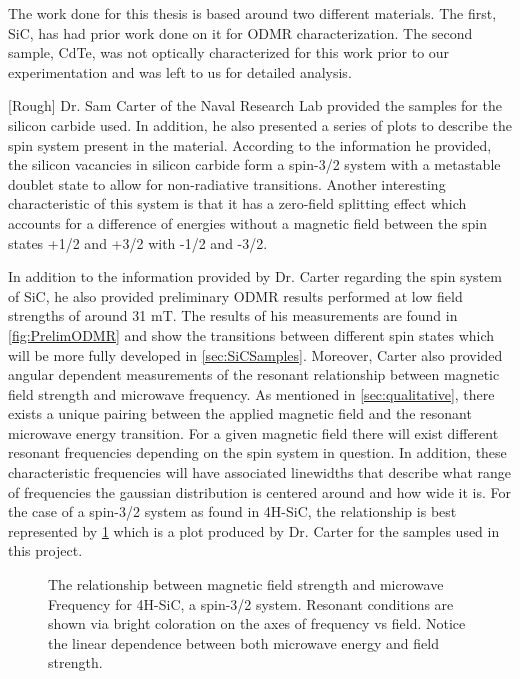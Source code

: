 \documentclass[oneside, astronomy, noacknowlegments]{BYUPhys}
\begin{document}
The work done for this thesis is based around two different materials. The first, SiC, has had prior work done on it for ODMR characterization. The second sample, CdTe, was not optically characterized for this work prior to our experimentation and was left to us for detailed analysis.

[Rough] Dr. Sam Carter of the Naval Research Lab provided the samples for the silicon carbide used. In addition, he also presented a series of plots to describe the spin system present in the material. According to the information he provided, the silicon vacancies in silicon carbide form a spin-3/2 system with a metastable doublet state to allow for non-radiative transitions. Another interesting characteristic of this system is that it has a zero-field splitting effect which accounts for a difference of energies without a magnetic field between the spin states +1/2 and +3/2 with -1/2 and -3/2.

In addition to the information provided by Dr. Carter regarding the spin system of SiC, he also provided preliminary ODMR results performed at low field strengths of around 31 mT. The results of his measurements are found in \ref{fig:PrelimODMR} and show the transitions between different spin states which will be more fully developed in \ref{sec:SiCSamples}. Moreover, Carter also provided angular dependent measurements of the resonant relationship between magnetic field strength and microwave frequency. As mentioned in \ref{sec:qualitative}, there exists a unique pairing between the applied magnetic field and the resonant microwave energy transition. For a given magnetic field there will exist different resonant frequencies depending on the spin system in question. In addition, these characteristic frequencies will have associated linewidths that describe what range of frequencies the gaussian distribution is centered around and how wide it is. For the case of a spin-3/2 system as found in 4H-SiC, the relationship is best represented by \ref{fig:MFRelationship} which is a plot produced by Dr. Carter for the samples used in this project.

\begin{figure}
    \caption[Magnetic field and microwave frequency relationship]{\label{fig:MFRelationship}
     The relationship between magnetic field strength and microwave Frequency for 4H-SiC, a spin-3/2 system. Resonant conditions are shown via bright coloration on the axes of frequency vs field. Notice the linear dependence between both microwave energy and field strength.}
 \end{figure}
 
\end{document}
